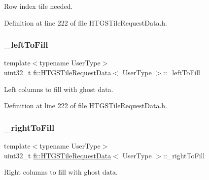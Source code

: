 Row index tile needed. 



Definition at line 222 of file H\+T\+G\+S\+Tile\+Request\+Data.\+h.

\mbox{\label{classfi_1_1HTGSTileRequestData_a578001203e7c4ea6ceed05ca939ebbe1}} 
\subsubsection{\texorpdfstring{\+\_\+left\+To\+Fill}{\_leftToFill}}
{\footnotesize\ttfamily template$<$typename User\+Type$>$ \\
uint32\+\_\+t \hyperlink{classfi_1_1HTGSTileRequestData}{fi\+::\+H\+T\+G\+S\+Tile\+Request\+Data}$<$ User\+Type $>$\+::\+\_\+left\+To\+Fill\hspace{0.3cm}{\ttfamily [private]}}



Left columns to fill with ghost data. 



Definition at line 222 of file H\+T\+G\+S\+Tile\+Request\+Data.\+h.

\mbox{\label{classfi_1_1HTGSTileRequestData_aa1ed6a475609fcca16251fc93e0b5cef}} 
\subsubsection{\texorpdfstring{\+\_\+right\+To\+Fill}{\_rightToFill}}
{\footnotesize\ttfamily template$<$typename User\+Type$>$ \\
uint32\+\_\+t \hyperlink{classfi_1_1HTGSTileRequestData}{fi\+::\+H\+T\+G\+S\+Tile\+Request\+Data}$<$ User\+Type $>$\+::\+\_\+right\+To\+Fill\hspace{0.3cm}{\ttfamily [private]}}



Right columns to fill with ghost data. 



